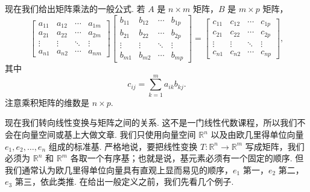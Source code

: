 现在我们给出矩阵乘法的一般公式. 若 $A$ 是 $n\times m$ 矩阵，$B$ 是 $m\times p$ 矩阵，
\[
\begin{bmatrix}
a_{11}&a_{12}&\cdots&a_{1m}\\
a_{21}&a_{22}&\cdots&a_{2m}\\
\vdots&\vdots&\ddots&\vdots\\
a_{n1}&a_{n2}&\cdots&a_{nm}
\end{bmatrix}
\begin{bmatrix}
b_{11}&b_{12}&\cdots&b_{1p}\\
b_{21}&b_{22}&\cdots&b_{2p}\\
\vdots&\vdots&\ddots&\vdots\\
b_{m1}&b_{m2}&\cdots&b_{mp}
\end{bmatrix}
=
\begin{bmatrix}
c_{11}&c_{12}&\cdots&c_{1p}\\
c_{21}&c_{22}&\cdots&c_{2p}\\
\vdots&\vdots&\ddots&\vdots\\
c_{n1}&c_{n2}&\cdots&c_{np}
\end{bmatrix},
\]
其中
\[
c_{ij}=\sum_{k=1}^{m}a_{ik}b_{kj}.
\]
注意乘积矩阵的维数是 $n\times p$.

现在我们转向线性变换与矩阵之间的关系. 这不是一门线性代数课程，所以我们不会在向量空间或基上大做文章. 我们只使用向量空间 $\mathbb{R}^n$ 以及由欧几里得单位向量 $e_1,e_2,\ldots,e_n$ 组成的标准基. 严格地说，要把线性变换 $T:\mathbb{R}^n\to\mathbb{R}^m$ 写成矩阵，我们必须为 $\mathbb{R}^n$ 和 $\mathbb{R}^m$ 各取一个有序基；也就是说，基元素必须有一个固定的顺序. 但我们通常认为欧几里得单位向量具有直观上显而易见的顺序，$e_1$ 第一，$e_2$ 第二，$e_3$ 第三，依此类推. 在给出一般定义之前，我们先看几个例子.

